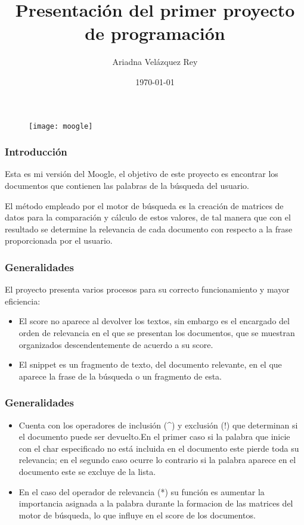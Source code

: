 \documentclass{beamer}
\title{Presentación del primer proyecto de programación}
\author{Ariadna Velázquez Rey}
\date{\today}
\begin{document}
\begin{frame}
    \maketitle

    \begin{figure}[h]
        \centering
        \texttt{[image: moogle]}
    \end{figure}
\end{frame}

\begin{frame}
    \frametitle{Introducción}
    Esta es mi versión del Moogle, el objetivo de este proyecto es encontrar los documentos que contienen las palabras 
    de la búsqueda del usuario. 

    El método empleado por el motor de búsqueda es la creación de matrices de datos para la comparación y cálculo de 
    estos valores, de tal manera que con el resultado se determine la relevancia de cada documento con respecto a la 
    frase proporcionada por el usuario.
\end{frame}

\begin{frame}
    \frametitle{Generalidades}
      El proyecto presenta varios procesos para su correcto funcionamiento y mayor eficiencia:

    \begin{itemize}
        \item El score no aparece al devolver los textos, sin embargo es el encargado del orden de relevancia en el 
        que se presentan los documentos, que se muestran organizados descendentemente de acuerdo a su score.
        \item El snippet es un fragmento de texto, del documento relevante, en el que aparece la frase de la búsqueda 
        o un fragmento de esta.
    \end{itemize}    
\end{frame}

\begin{frame}
    \frametitle{Generalidades}
    \begin{itemize}
        \item Cuenta con los operadores de inclusión (\^{}) y exclusión (!) que determinan si el documento puede ser 
        devuelto.En el primer caso si la palabra que inicie con el char especificado no está incluida en el documento 
        este pierde toda su relevancia; en el segundo caso ocurre lo contrario si la palabra aparece en el documento 
        este se excluye de la lista.
        \item En el caso del operador de relevancia (*) su función es aumentar la importancia asignada a la palabra 
        durante la formacion de las matrices del motor de búsqueda, lo que influye en el score de los documentos.
    \end{itemize}
\end{frame}
\end{document}
